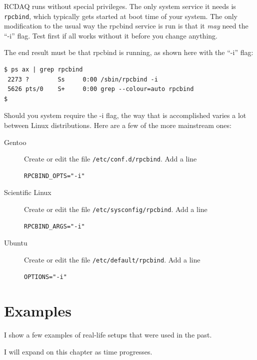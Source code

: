 \documentclass{article}[11pt]
\begin{document}
RCDAQ runs without special privileges. The only system service it
needs is \verb|rpcbind|, which typically gets started at boot time of
your system. The only modification to the usual way the rpcbind
service is run is that it \emph{may} need the ``-i'' flag. Test first
if all works without it before you change anything.

The end result must be that rpcbind is running, as shown here with the
``-i'' flag:

\begin{verbatim} 
$ ps ax | grep rpcbind
 2273 ?        Ss     0:00 /sbin/rpcbind -i
 5626 pts/0    S+     0:00 grep --colour=auto rpcbind
$
\end{verbatim}

Should you system require the -i flag, the way that is accomplished varies
a lot between Linux distributions. Here are a few of the more
mainstream ones:

\begin{description}

\item[Gentoo]  Create or edit the file \verb|/etc/conf.d/rpcbind|. Add a line

\begin{verbatim} 
RPCBIND_OPTS="-i"  
\end{verbatim}

\item[Scientific Linux]  Create or edit the file \verb|/etc/sysconfig/rpcbind|. Add a line

\begin{verbatim} 
RPCBIND_ARGS="-i"  
\end{verbatim}

\item[Ubuntu]  Create or edit the file \verb|/etc/default/rpcbind|. Add a line

\begin{verbatim} 
OPTIONS="-i"  
\end{verbatim}

\end{description}



\appendix

\section{Examples}

I show a few examples of real-life setups that were used in the past.

I will expand on this chapter as time progresses.
\end{document}
